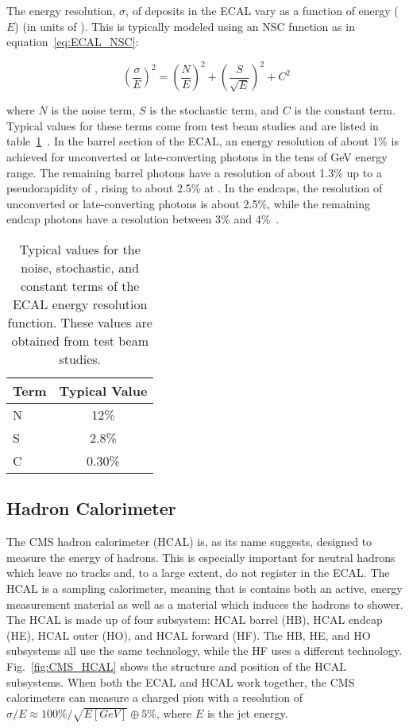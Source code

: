 The energy resolution, $\sigma$, of deposits in the ECAL vary as a function of energy ($E$) (in units of \unit{\gev}).
This is typically modeled using an NSC function as in equation~\ref{eq:ECAL_NSC}:

\begin{equation}
\label{eq:ECAL_NSC}
\left(\frac{\sigma}{E}\right)^{2}=\left(\frac{N}{E}\right)^{2}+\left(\frac{S}{\sqrt{E}}\right)^{2}+C^{2}
\end{equation}

\noindent where $N$ is the noise term, $S$ is the stochastic term, and $C$ is the constant term.
Typical values for these terms come from test beam studies and are listed in table~\ref{tab:ECAL_NSC}~\cite{CMS:2013ecal}.
In the barrel section of the ECAL, an energy resolution of about 1\% is achieved for unconverted or late-converting photons in the tens of GeV energy range.
The remaining barrel photons have a resolution of about 1.3\% up to a pseudorapidity of , rising to about 2.5\% at .
In the endcaps, the resolution of unconverted or late-converting photons is about 2.5\%, while the remaining endcap photons have a resolution between 3\% and 4\%~\cite{CMS:EGM-14-001}.

\begin{table}[htbp]
\caption{Typical values for the noise, stochastic, and constant terms of the ECAL energy resolution function. These values are obtained from test beam studies.}
\centering
\begin{tabular}{|l|c|}%
\hline %
Term & Typical Value \\%
\hline
N & 12\% \\%
S & 2.8\% \\%
C & 0.30\% \\%
\hline
\end{tabular}
\label{tab:ECAL_NSC}
\end{table}

\subsection{Hadron Calorimeter}
\label{sec:hadron_calorimeter}

The CMS hadron calorimeter (HCAL) is, as its name suggests, designed to measure the energy of hadrons.
This is especially important for neutral hadrons which leave no tracks and, to a large extent, do not register in the ECAL.
The HCAL is a sampling calorimeter, meaning that is contains both an active, energy measurement material as well as a material which induces the hadrons to shower.
The HCAL is made up of four subsystem: HCAL barrel (HB), HCAL endcap (HE), HCAL outer (HO), and HCAL forward (HF).
The HB, HE, and HO subsystems all use the same technology, while the HF uses a different technology.
Fig.~\ref{fig:CMS_HCAL} shows the structure and position of the HCAL subsystems.
When both the ECAL and HCAL work together, the CMS calorimeters can measure a charged pion with a resolution of $\sigma/E\approx100\%/\sqrt{E[GeV]}\oplus5\%$, where $E$ is the jet energy.

